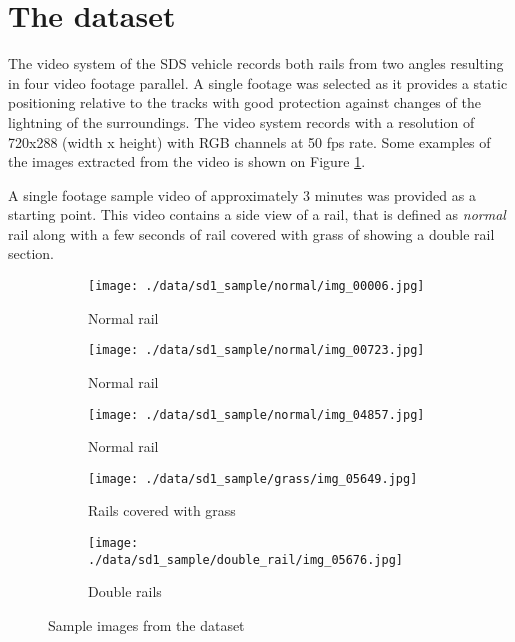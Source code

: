 \section{The dataset} \label{dataset}
The video system of the SDS vehicle records both rails from two angles resulting in four video footage
parallel.
A single footage was selected as it provides a static positioning relative to the tracks with good
protection against changes of the lightning of the surroundings.
The video system records with a resolution of 720x288 (width x height) with RGB channels
at 50 fps rate.
Some examples of the images extracted from the video is shown on Figure \ref{fig:example_images}.

A single footage sample video of approximately 3 minutes was provided as a starting point.
This video contains a side view of a rail, that is defined as \emph{normal} rail
along with a few seconds of rail covered with grass of showing a double rail section.

\begin{figure}[!ht]
    \centering
    \begin{subfigure}{0.3\textwidth}
        \centering
        \texttt{[image: ./data/sd1\_sample/normal/img\_00006.jpg]}
        \caption*{Normal rail}
    \end{subfigure}
    \begin{subfigure}{0.3\textwidth}
        \centering
        \texttt{[image: ./data/sd1\_sample/normal/img\_00723.jpg]}
        \caption*{Normal rail}
    \end{subfigure}
    \begin{subfigure}{0.3\textwidth}
        \centering
        \texttt{[image: ./data/sd1\_sample/normal/img\_04857.jpg]}
        \caption*{Normal rail}
    \end{subfigure}
    \begin{subfigure}{0.3\textwidth}
        \centering
        \texttt{[image: ./data/sd1\_sample/grass/img\_05649.jpg]}
        \caption*{Rails covered with grass}
    \end{subfigure}
    \begin{subfigure}{0.3\textwidth}
        \centering
        \texttt{[image: ./data/sd1\_sample/double\_rail/img\_05676.jpg]}
        \caption*{Double rails}
    \end{subfigure}
    \caption{Sample images from the dataset}
    \label{fig:example_images}
\end{figure}

